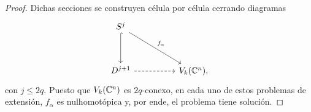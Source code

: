 \begin{proof}
Dichas secciones se construyen célula por célula cerrando diagramas
$$
\begin{tikzcd}[row sep = huge, column sep = huge]
    S^j \arrow[d, hook] \arrow[rd, "f_\alpha"] \\
    D^{j+1} \arrow[r, dashed] & V_k(\C^n),
\end{tikzcd}
$$
con $j \le 2q$. Puesto que $V_k(\mathbb C^n)$ es $2q$-conexo, en cada uno de estos problemas de extensión, $f_\alpha$ es nulhomotópica y, por ende, el problema tiene solución.
\end{proof}
